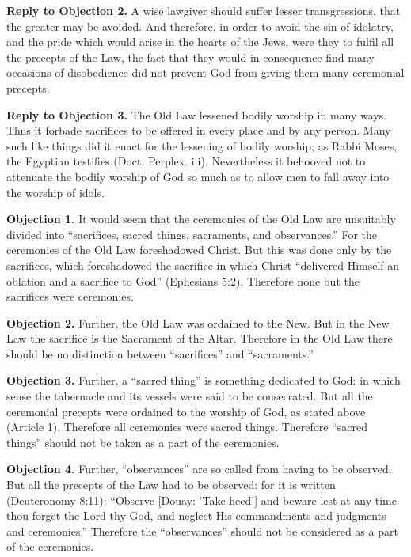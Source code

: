 \textbf{Reply to Objection 2.} A wise lawgiver should suffer lesser transgressions, that the greater may be avoided. And therefore, in order to avoid the sin of idolatry, and the pride which would arise in the hearts of the Jews, were they to fulfil all the precepts of the Law, the fact that they would in consequence find many occasions of disobedience did not prevent God from giving them many ceremonial precepts.

\textbf{Reply to Objection 3.} The Old Law lessened bodily worship in many ways. Thus it forbade sacrifices to be offered in every place and by any person. Many such like things did it enact for the lessening of bodily worship; as Rabbi Moses, the Egyptian testifies (Doct. Perplex. iii). Nevertheless it behooved not to attenuate the bodily worship of God so much as to allow men to fall away into the worship of idols.


\textbf{Objection 1.} It would seem that the ceremonies of the Old Law are unsuitably divided into ``sacrifices, sacred things, sacraments, and observances.'' For the ceremonies of the Old Law foreshadowed Christ. But this was done only by the sacrifices, which foreshadowed the sacrifice in which Christ ``delivered Himself an oblation and a sacrifice to God'' (Ephesians 5:2). Therefore none but the sacrifices were ceremonies.

\textbf{Objection 2.} Further, the Old Law was ordained to the New. But in the New Law the sacrifice is the Sacrament of the Altar. Therefore in the Old Law there should be no distinction between ``sacrifices'' and ``sacraments.''

\textbf{Objection 3.} Further, a ``sacred thing'' is something dedicated to God: in which sense the tabernacle and its vessels were said to be consecrated. But all the ceremonial precepts were ordained to the worship of God, as stated above (Article 1). Therefore all ceremonies were sacred things. Therefore ``sacred things'' should not be taken as a part of the ceremonies.

\textbf{Objection 4.} Further, ``observances'' are so called from having to be observed. But all the precepts of the Law had to be observed: for it is written (Deuteronomy 8:11): ``Observe [Douay: 'Take heed'] and beware lest at any time thou forget the Lord thy God, and neglect His commandments and judgments and ceremonies.'' Therefore the ``observances'' should not be considered as a part of the ceremonies.

